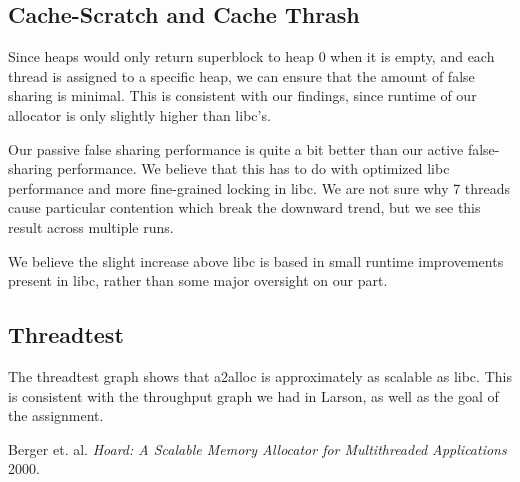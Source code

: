 \documentclass[a4paper, 12pt]{article}
\begin{document}
\subsection{Cache-Scratch and Cache Thrash}
Since heaps would only return superblock to heap 0 when it is empty, and each thread is assigned to a specific heap, we can ensure that the amount of false sharing is minimal. This is consistent with our findings, since runtime of our allocator is only slightly higher than libc's.

Our passive false sharing performance is quite a bit better than our active false-sharing performance. We believe that this has to do with optimized libc performance and more fine-grained locking in libc. We are not sure why 7 threads cause particular contention which break the downward trend, but we see this result across multiple runs.

We believe the slight increase above libc is based in small runtime improvements present in libc, rather than some major oversight on our part.

\subsection{Threadtest}

The threadtest graph shows that a2alloc is approximately as scalable as libc. This is consistent with the throughput graph we had in Larson, as well as the goal of the assignment.

\begin{thebibliography}{1}
	 Berger et. al. {\em Hoard: A Scalable Memory Allocator for Multithreaded Applications} 2000.
\end{thebibliography}
\end{document}
